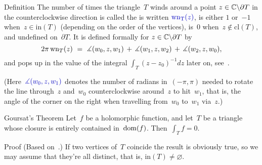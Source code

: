 \documentclass[a]{subfiles}
\begin{document}
\begin{parsec}
\begin{point}{Definition}
The number of times the triangle~$T$ winds
around a point $z\in \mathbb{C}\backslash \partial T$
in the counterclockwise direction
is
called the 
%
is
written $\Define{\mathrm{wn_T}(z)}$,%
is either $1$ or~$-1$ when~$z\in\mathrm{in}(T)$
(depending on the order of the vertices),
is~$0$ when~$z\notin\mathrm{cl}(T)$,
and undefined on~$\partial T$.
It is defined formally for $z\in \mathbb{C}\backslash \partial T$ by
\begin{equation*}
	\textstyle
2\pi \wn_T(z)\ = \ 
\measuredangle(w_0,z,w_1)
\,+\,\measuredangle(w_1,z,w_2)
\,+\, \measuredangle(w_2,z,w_0),
\end{equation*}
and pops
up in the value of the integral $\int_T (z-z_0)^{-1}dz$
later on,
see~.

(Here~$\Define{\measuredangle(w_0,z,w_1)}$%
%
denotes the number of radians in~$(-\pi,\pi)$
needed to rotate the line through~$z$ and~$w_0$ counterclockwise
around~$z$ to hit~$w_1$,
that is, the angle of the corner on the right when travelling
from~$w_0$ to~$w_1$ via~$z$.)
\end{point}
\begin{point}[goursat]{Goursat's Theorem}%
%
Let~$f$ be a holomorphic function,
and let~$T$ be a triangle whose closure
is entirely contained in~$\operatorname{dom}(f)$.
Then~$\int_T f = 0$.
\begin{point}[goursat-1]{Proof}%
(Based on~\cite{moore1900}.)
If two vertices of~$T$ coincide
the result is obviously true,
so we may assume that they're all distinct,
that is, $\mathrm{in}(T)\neq \varnothing$.


\end{point}
\end{point}
\end{parsec}
\end{document}
